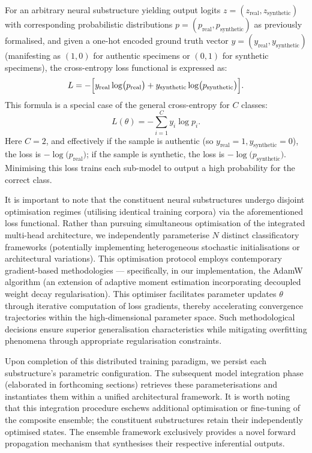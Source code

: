 \documentclass[conference]{IEEEtran}  %
\begin{document}
For an arbitrary neural substructure yielding output logits \(z = (z_{\text{real}}, z_{\text{synthetic}})\) with corresponding probabilistic distributions \(p = (p_{\text{real}}, p_{\text{synthetic}})\) as previously formalised, and given a one-hot encoded ground truth vector \(y = (y_{\text{real}}, y_{\text{synthetic}})\) (manifesting as \((1,0)\) for authentic specimens or \((0,1)\) for synthetic specimens), the cross-entropy loss functional is expressed as:
\begin{equation}
\label{eq:cross_entropy_binary}
L = -\Bigl[ y_{\text{real}} \log\bigl(p_{\text{real}}\bigr) + y_{\text{synthetic}} \log\bigl(p_{\text{synthetic}}\bigr) \Bigr].
\end{equation}
This formula is a special case of the general cross-entropy for \(C\) classes:
\begin{equation}
\label{eq:cross_entropy_general}
L(\theta) = -\sum_{i=1}^{C} y_i \log p_i.
\end{equation}
Here \(C=2\), and effectively if the sample is authentic (so \(y_{\text{real}}=1, y_{\text{synthetic}}=0\)), the loss is \(-\log\bigl(p_{\text{real}}\bigr)\); if the sample is synthetic, the loss is \(-\log\bigl(p_{\text{synthetic}}\bigr)\). Minimising this loss trains each sub-model to output a high probability for the correct class.

It is important to note that the constituent neural substructures undergo disjoint optimisation regimes (utilising identical training corpora) via the aforementioned loss functional. Rather than pursuing simultaneous optimisation of the integrated multi-head architecture, we independently parameterise \(N\) distinct classificatory frameworks (potentially implementing heterogeneous stochastic initialisations or architectural variations). This optimisation protocol employs contemporary gradient-based methodologies --- specifically, in our implementation, the AdamW algorithm (an extension of adaptive moment estimation incorporating decoupled weight decay regularisation). This optimiser facilitates parameter updates \(\theta\) through iterative computation of loss gradients, thereby accelerating convergence trajectories within the high-dimensional parameter space. Such methodological decisions ensure superior generalisation characteristics while mitigating overfitting phenomena through appropriate regularisation constraints.

Upon completion of this distributed training paradigm, we persist each substructure's parametric configuration. The subsequent model integration phase (elaborated in forthcoming sections) retrieves these parameterisations and instantiates them within a unified architectural framework. It is worth noting that this integration procedure eschews additional optimisation or fine-tuning of the composite ensemble; the constituent substructures retain their independently optimised states. The ensemble framework exclusively provides a novel forward propagation mechanism that synthesises their respective inferential outputs.
\end{document}
